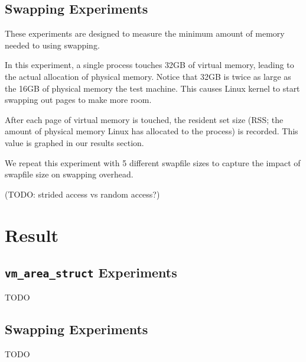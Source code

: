 \documentclass[twocolumn,11pt]{article}
\begin{document}
\subsection{Swapping Experiments}

These experiments are designed to measure the minimum amount of memory needed
to using swapping.

In this experiment, a single process touches 32GB of virtual memory, leading to
the actual allocation of physical memory. Notice that 32GB is twice as large as
the 16GB of physical memory the test machine. This causes Linux kernel to start
swapping out pages to make more room.

After each page of virtual memory is touched, the resident set size (RSS; the
amount of physical memory Linux has allocated to the process) is recorded. This
value is graphed in our results section.

We repeat this experiment with 5 different swapfile sizes to capture the impact
of swapfile size on swapping overhead.

(TODO: strided access vs random access?)

\section{Result}

\subsection{\texttt{vm\_area\_struct} Experiments}

TODO

\subsection{Swapping Experiments}

TODO

{}

\end{document}
